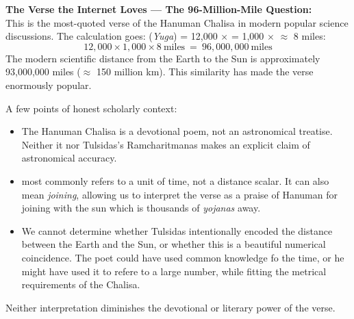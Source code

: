 \begin{tcolorbox}[poetrybox]
\textbf{The Verse the Internet Loves — The 96-Million-Mile Question:}\\
This is the most-quoted verse of the Hanuman Chalisa in modern popular science discussions. The calculation goes:
 (\textit{Yuga}) = 12,000 $\times$  = 1,000 $\times$  $\approx$ 8 miles:
\[
12{,}000 \times 1{,}000 \times 8~\text{miles} ~=~ 96{,}000{,}000~\text{miles}
\]
The modern scientific distance from the Earth to the Sun is approximately 93,000,000 miles ($\approx$ 150 million km). This similarity has made the verse enormously popular.

A few points of honest scholarly context:
\begin{itemize}
  \item The Hanuman Chalisa is a devotional poem, not an astronomical treatise. Neither it nor Tulsidas's Ramcharitmanas makes an explicit claim of astronomical accuracy.
  \item {} most commonly refers to a unit of time, not a distance scalar.  
    It can also mean \textit{joining}, allowing us to interpret the verse as a praise of Hanuman for joining with the sun which is thousands of \textit{yojanas} away.
  \item We cannot determine whether Tulsidas intentionally encoded the distance between the Earth and the Sun, or whether this is a beautiful numerical coincidence.  
  The poet could have used common knowledge fo the time, or he might have used it to refere to a large number, while fitting the metrical requirements of the Chalisa. 
\end{itemize}
 Neither interpretation diminishes the devotional or literary power of the verse.
\end{tcolorbox}

\newpage

